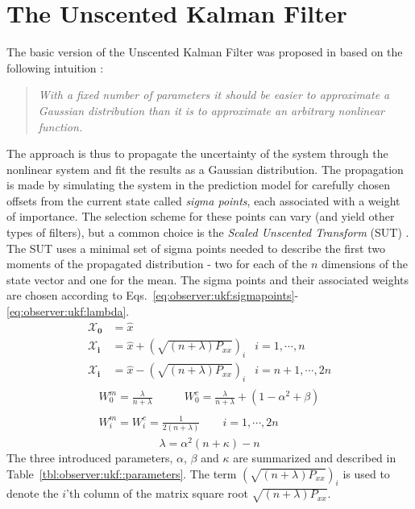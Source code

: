 \section{The Unscented Kalman Filter}
\label{sec:observer:ukf}
    The basic version of the Unscented Kalman Filter was proposed in \citep{Julier95anewapproach}
    based on the following intuition \citep{Julier95anewapproach}:
    \begin{quote}\textit{
        With a fixed number of parameters it should be easier to approximate a Gaussian
        distribution than it is to approximate an arbitrary nonlinear function.
        }
    \end{quote}
    The approach is thus to propagate the uncertainty of the system
    through the nonlinear system and fit the results as a Gaussian distribution.
    The propagation is made by simulating the system in the prediction
    model for carefully chosen offsets from the current state called
    \textit{sigma points}, each associated with a weight of importance.
    The selection scheme for these points can vary (and yield other
    types of filters), but a common choice
    is the \textit{Scaled Unscented Transform} (SUT) \citep{vandermerwe:upf}.
    The SUT uses a minimal set of sigma points needed to describe the
    first two moments of the propagated distribution - two for each
    of the $n$ dimensions of the state vector and one for the mean.
    The sigma points and their associated weights are chosen according to
    Eqs.~\eqref{eq:observer:ukf:sigmapoints}-\eqref{eq:observer:ukf:lambda}.
    \begin{align}\nonumber
        \mathbf{\mathcal{X}_{0}} &= \hat{x} & \\\nonumber
        \mathbf{\mathcal{X}_{i}} &= \hat{x} + \left( \sqrt{(n + \lambda) P_{xx}} \right)_{i}
            & i = 1,\cdots,n \\
        \mathbf{\mathcal{X}_{i}} &= \hat{x} - \left( \sqrt{(n + \lambda) P_{xx}} \right)_{i}
            & i = n+1,\cdots,2n
    \end{align}
    \begin{align}\nonumber
        \begin{array}{lr}
        W_{0}^{m} = \frac{\lambda}{n + \lambda} \qquad&
            W_{0}^{c} = \frac{\lambda}{n + \lambda} + (1-\alpha^{2} + \beta){}
        \end{array}\\
        \begin{array}{c}
            W^{m}_{i} =  W^{c}_{i} = \frac{1}{2(n + \lambda)} \qquad i = 1,\cdots,2n{}
        \end{array}
        \label{eq:observer:ukf:sigmapoints}
    \end{align}
    \begin{equation}
    \label{eq:observer:ukf:lambda}
        \lambda = \alpha^{2}(n + \kappa) - n
    \end{equation}
    The three introduced parameters, $\alpha$, $\beta$ and $\kappa$
    are summarized and described in Table~\ref{tbl:observer:ukf::parameters}.
    The term $\left( \sqrt{(n + \lambda) P_{xx}} \right)_{i}$ is used to
    denote the $i$'th column of the matrix square root $\sqrt{(n + \lambda) P_{xx}}$.


